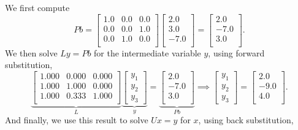 \documentclass[letterpaper]{book}
\begin{document}
We first compute 
$$P b = \left[
\begin{array}{ccc}
1.0 & 0.0 & 0.0 \\
0.0 & 0.0 & 1.0 \\
0.0 & 1.0 & 0.0 \\
\end{array}
\right] \left[
\begin{array}{r}
2.0 \\
3.0 \\
-7.0 \\
\end{array}
\right] = \left[
\begin{array}{r}
2.0 \\
-7.0 \\
3.0 \\
\end{array}
\right]. $$
We then solve $L y = P b$ for the intermediate variable $y$, using forward substitution, 
$$\underbrace{\left[ \begin{array}{ccc}
1.000 & 0.000 & 0.000 \\
1.000 & 1.000 & 0.000 \\
1.000 & 0.333 & 1.000 \\
\end{array}
\right]}_{L} \underbrace{\begin{bmatrix}y_1 \\y_2 \\ y_3 \end{bmatrix}}_{y} =\underbrace{ \left[
\begin{array}{r}
2.0 \\
-7.0 \\
3.0 \\
\end{array}
\right]}_{P b} \implies\begin{bmatrix}y_1 \\y_2 \\ y_3 \end{bmatrix} = \left[
\begin{array}{r}
2.0 \\
-9.0 \\
4.0 \\
\end{array}
\right]. $$
And finally, we use this result to solve $U x = y$ for $x$, using back substitution,
\end{document}
